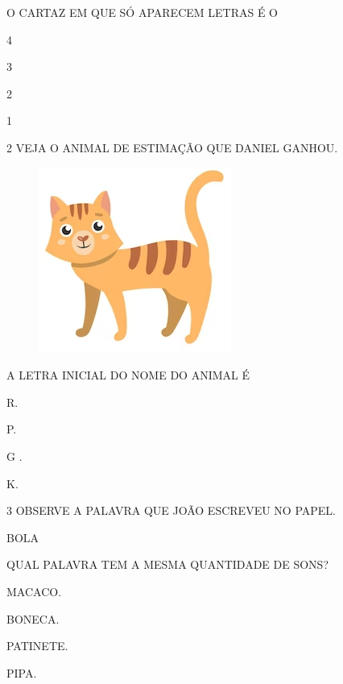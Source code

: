 O CARTAZ EM QUE SÓ APARECEM LETRAS É O

\begin{escolha}
\item 4

\item 3

\item 2 

\item 1
\end{escolha}

\pagebreak
\num{2} VEJA O ANIMAL DE ESTIMAÇÃO QUE DANIEL GANHOU.

\begin{figure}[htpb!]
\centering
\includegraphics[width=.4\textwidth]{media/image187.png}
\end{figure}

A LETRA INICIAL DO NOME DO ANIMAL É 

\begin{escolha}
\item R.

\item P.

\item G .

\item K.
\end{escolha}

\num{3} OBSERVE A PALAVRA QUE JOÃO ESCREVEU NO PAPEL.

\begin{myquote}
BOLA
\end{myquote}

QUAL PALAVRA TEM A MESMA QUANTIDADE DE SONS? 

\begin{escolha}
\item MACACO.

\item BONECA.

\item PATINETE.

\item PIPA.
\end{escolha}

